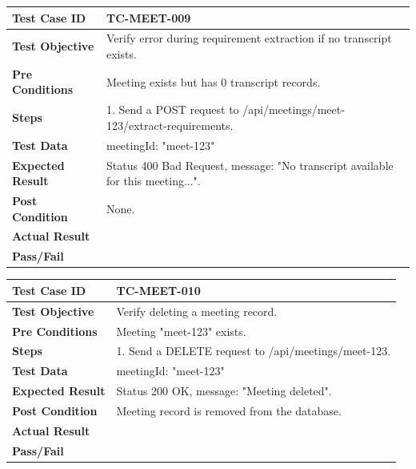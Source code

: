 \begin{longtable}{|p{}|p{}|}
\hline
\textbf{Test Case ID} & TC-MEET-009 \\ \hline
\textbf{Test Objective} & Verify error during requirement extraction if no transcript exists. \\ \hline
\textbf{Pre Conditions} & Meeting exists but has 0 transcript records. \\ \hline
\textbf{Steps} & 
1. Send a POST request to /api/meetings/meet-123/extract-requirements. \\ \hline
\textbf{Test Data} & meetingId: "meet-123" \\ \hline
\textbf{Expected Result} & Status 400 Bad Request, message: "No transcript available for this meeting...". \\ \hline
\textbf{Post Condition} & None. \\ \hline
\textbf{Actual Result} &  \\ \hline
\textbf{Pass/Fail} &  \\ \hline
\end{longtable}

\begin{longtable}{|p{}|p{}|}
\hline
\textbf{Test Case ID} & TC-MEET-010 \\ \hline
\textbf{Test Objective} & Verify deleting a meeting record. \\ \hline
\textbf{Pre Conditions} & Meeting "meet-123" exists. \\ \hline
\textbf{Steps} & 
1. Send a DELETE request to /api/meetings/meet-123. \\ \hline
\textbf{Test Data} & meetingId: "meet-123" \\ \hline
\textbf{Expected Result} & Status 200 OK, message: "Meeting deleted". \\ \hline
\textbf{Post Condition} & Meeting record is removed from the database. \\ \hline
\textbf{Actual Result} &  \\ \hline
\textbf{Pass/Fail} &  \\ \hline
\end{longtable}
